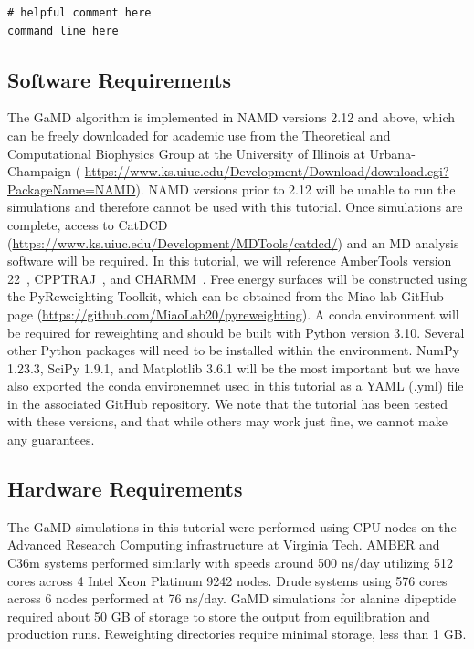 \documentclass[9pt,tutorial]{livecoms}
\begin{document}
\begin{lstlisting}[label=example,caption=example\_code\_box.sh, basicstyle=\small, breaklines=true, backgroundcolor=\color{light-gray}]
# helpful comment here
command line here
\end{lstlisting}

\subsection{Software Requirements} The GaMD algorithm is implemented in NAMD versions 2.12 and above, which can be freely downloaded for academic use from the Theoretical and Computational Biophysics Group at the University of Illinois at Urbana-Champaign ( \url{https://www.ks.uiuc.edu/Development/Download/download.cgi?PackageName=NAMD}). NAMD versions prior to 2.12 will be unable to run the simulations and therefore cannot be used with this tutorial. Once simulations are complete, access to CatDCD (\url{https://www.ks.uiuc.edu/Development/MDTools/catdcd/}) and an MD analysis software will be required. In this tutorial, we will reference AmberTools version 22~\cite{case_ambertools_2023}, CPPTRAJ~\cite{roe_ptraj_2013}, and CHARMM~\cite{hwang_charmm_2024}. Free energy surfaces will be constructed using the PyReweighting Toolkit, which can be obtained from the Miao lab GitHub page (\url{https://github.com/MiaoLab20/pyreweighting}). A conda environment will be required for reweighting and should be built with Python version 3.10. Several other Python packages will need to be installed within the environment. NumPy 1.23.3, SciPy 1.9.1, and Matplotlib 3.6.1 will be the most important but we have also exported the conda environemnet used in this tutorial as a YAML (.yml) file in the associated GitHub repository. We note that the tutorial has been tested with these versions, and that while others may work just fine, we cannot make any guarantees.


\subsection{Hardware Requirements} The GaMD simulations in this tutorial were performed using CPU nodes on the Advanced Research Computing infrastructure at Virginia Tech. AMBER and C36m systems performed similarly with speeds around 500 ns/day utilizing 512 cores across 4 Intel Xeon Platinum 9242 nodes. Drude systems using 576 cores across 6 nodes performed at 76 ns/day. GaMD simulations for alanine dipeptide required about 50 GB of storage to store the output from equilibration and production runs. Reweighting directories require minimal storage, less than 1 GB.
\end{document}

